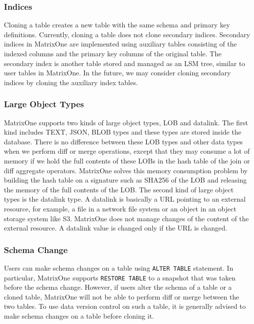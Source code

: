 \documentclass[sigconf,nonacm]{acmart} %
\begin{document}
\subsubsection{Indices}
Cloning a table creates a new table with the same schema and primary key definitions.
Currently, cloning a table does not clone secondary indices.  
Secondary indices in MatrixOne are implemented using auxiliary tables
consisting of the indexed columns and the primary key columns of 
the original table. The secondary index is another table stored and managed as
an LSM tree, similar to user tables in MatrixOne. In the future, we may consider cloning 
secondary indices by cloning the auxiliary index tables.  

\subsubsection{Large Object Types}
MatrixOne supports two kinds of large object types, LOB and datalink.
The first kind includes TEXT, JSON, BLOB types and these types are 
stored inside the database.  There is no difference between these 
LOB types and other data types when we perform diff or merge operations,
except that they may consume a lot of memory if we hold the full contents
of these LOBs in the hash table of the join or diff aggregate operators. 
MatrixOne solves this memory consumption problem by building the hash 
table on a signature such as SHA256 of the LOB and releasing the memory 
of the full contents of the LOB.  The second kind of large object types 
is the datalink type.  A datalink is basically a URL pointing to an 
external resource, for example, a file in a network file system or 
an object in an object storage system like S3.  MatrixOne does not 
manage changes of the content of the external resource.  A datalink value 
is changed only if the URL is changed.

\subsubsection{Schema Change}
Users can make schema changes on a table using \texttt{ALTER TABLE} 
statement.  In particular, MatrixOne supports \texttt{RESTORE TABLE} 
to a snapshot that was taken before the schema change.  However, 
if users alter the schema of a table or a cloned table, MatrixOne
will not be able to perform diff or merge between the two tables.  
To use data version control on such a table, it is generally 
advised to make schema changes on a table before cloning it. 
\end{document}
